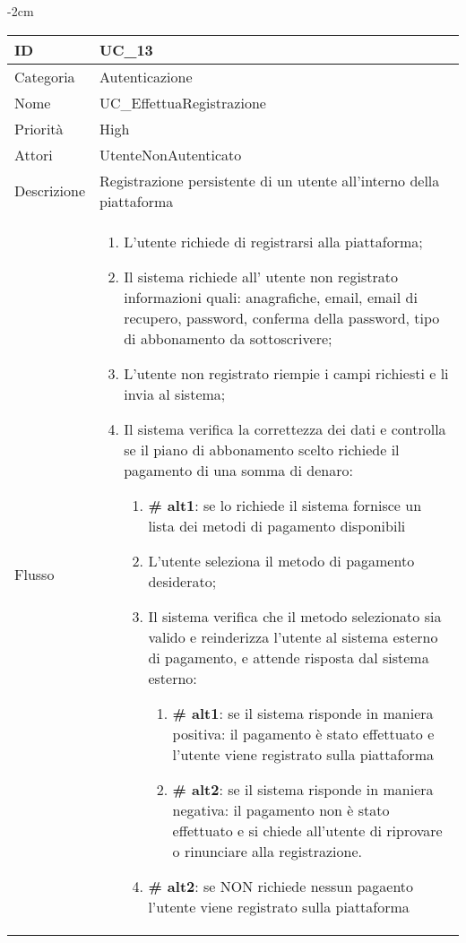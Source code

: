 \begin{center}
\begin{table}[bp]
    \centering
    \addtolength{\leftskip} {-2cm}
\begin{tabular}{ |p{2.6cm}|p{13cm}|  }
\hline
ID & UC\_13 \\\hline
Categoria & Autenticazione \\\hline
Nome & UC\_EffettuaRegistrazione \\\hline
Priorità & High \\\hline
Attori &  UtenteNonAutenticato \\\hline
Descrizione & Registrazione persistente di un utente all'interno della piattaforma \\\hline
Flusso &  	\vspace{-5mm} \begin{enumerate}
			\item L'utente richiede di registrarsi alla piattaforma;
			\item Il sistema richiede all' utente non registrato informazioni quali: anagrafiche, email, email di recupero, password, conferma della password, tipo di abbonamento da sottoscrivere;
			\item L'utente non registrato riempie i campi richiesti e li invia al sistema;
			\item Il sistema verifica la correttezza dei dati e controlla se il piano di abbonamento scelto richiede il pagamento di una somma di denaro:
			\begin{enumerate}[  ]
				\item\textbf{\# alt1}: se lo richiede il sistema fornisce un lista dei metodi di pagamento disponibili
				\item L'utente seleziona il metodo di pagamento desiderato;
				\item Il sistema verifica che il metodo selezionato sia valido e reinderizza l'utente al sistema esterno di pagamento, e attende risposta dal sistema esterno:
				\begin{enumerate}[label*=\arabic*.]
					\item \textbf{\# alt1}: se il sistema risponde in maniera positiva: il pagamento è stato effettuato e l'utente viene registrato sulla piattaforma 
					\item \textbf{\# alt2}: se il sistema risponde in maniera negativa: il pagamento non è stato effettuato e si chiede all'utente di riprovare o rinunciare alla registrazione.
				\end{enumerate}
				\item\textbf{\# alt2}: se NON richiede nessun pagaento l'utente viene registrato sulla piattaforma

\end{enumerate}
\end{enumerate}
\end{tabular}
\end{table}
\end{center}
